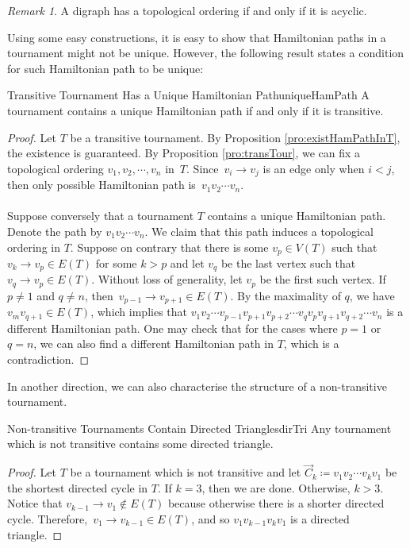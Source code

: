 \documentclass[math]{amznotes}
\theoremstyle{remark}
\newtheorem*{remark}{Remark}
\begin{document}
\begin{notebox}
    \begin{remark}
        A digraph has a topological ordering if and only if it is acyclic.
    \end{remark}
\end{notebox}
Using some easy constructions, it is easy to show that Hamiltonian paths in a tournament might not be unique. However, the following result states a condition for such Hamiltonian path to be unique:
\begin{probox}{Transitive Tournament Has a Unique Hamiltonian Path}{uniqueHamPath}
    A tournament contains a unique Hamiltonian path if and only if it is transitive.
    \tcblower
    \begin{proof}
        Let $T$ be a transitive tournament. By Proposition \ref{pro:existHamPathInT}, the existence is guaranteed. By Proposition \ref{pro:transTour}, we can fix a topological ordering $v_1, v_2, \cdots, v_n$ in~$T$. Since~$v_i \to v_j$ is an edge only when $i < j$, then only possible Hamiltonian path is~$v_1v_2\cdots v_n$.
        \\\\
        Suppose conversely that a tournament $T$ contains a unique Hamiltonian path. Denote the path by $v_1v_2\cdots v_n$. We claim that this path induces a topological ordering in $T$. Suppose on contrary that there is some $v_p \in V(T)$ such that $v_k \to v_p \in E(T)$ for some $k > p$ and let $v_q$ be the last vertex such that $v_q \to v_p \in E(T)$. Without loss of generality, let $v_p$ be the first such vertex. If $p \neq 1$ and $q \neq n$, then~$v_{p - 1} \to v_{p + 1} \in E(T)$. By the maximality of $q$, we have $v_mv_{q + 1} \in E(T)$, which implies that $v_1v_2\cdots v_{p - 1}v_{p + 1}v_{p + 2}\cdots v_qv_pv_{q + 1}v_{q + 2}\cdots v_n$ is a different Hamiltonian path. One may check that for the cases where $p = 1$ or $q = n$, we can also find a different Hamiltonian path in $T$, which is a contradiction.
    \end{proof}
\end{probox}
In another direction, we can also characterise the structure of a non-transitive tournament.
\begin{probox}{Non-transitive Tournaments Contain Directed Triangles}{dirTri}
    Any tournament which is not transitive contains some directed triangle.
    \tcblower
    \begin{proof}
        Let $T$ be a tournament which is not transitive and let $\overrightarrow{C}_k \coloneqq v_1v_2\cdots v_kv_1$ be the shortest directed cycle in $T$. If $k = 3$, then we are done. Otherwise, $k > 3$. Notice that $v_{k - 1} \to v_1 \notin E(T)$ because otherwise there is a shorter directed cycle. Therefore,~$v_1 \to v_{k - 1} \in E(T)$, and so $v_1v_{k - 1}v_kv_1$ is a directed triangle.
    \end{proof}
\end{probox}
\end{document}
